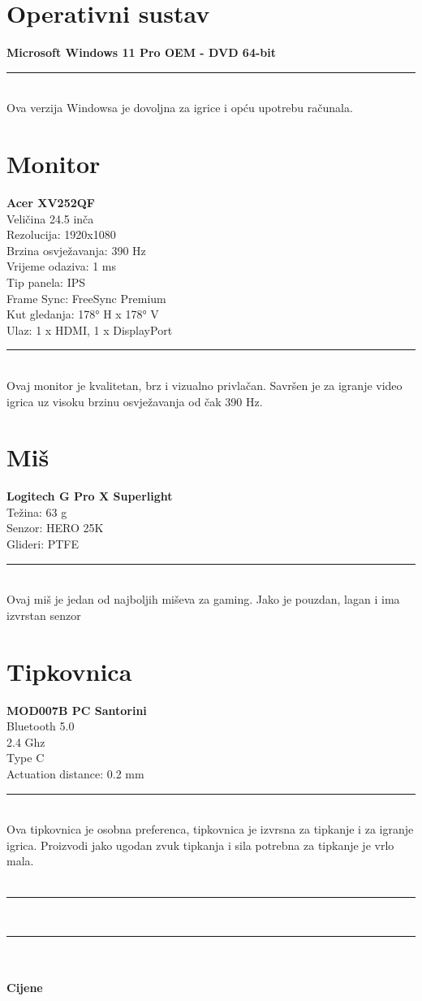 \documentclass{article}
\begin{document}
\section{Operativni sustav}
\textbf{Microsoft Windows 11 Pro OEM - DVD 64-bit}
\\ \rule{\textwidth}{0.5pt}
\\ Ova verzija Windowsa je dovoljna za igrice i opću upotrebu računala.

\section{Monitor}
\textbf{Acer XV252QF}
\\ Veličina 24.5 inča
\\ Rezolucija: 1920x1080
\\ Brzina osvježavanja: 390 Hz
\\ Vrijeme odaziva: 1 ms
\\ Tip panela: IPS
\\ Frame Sync: FreeSync Premium
\\ Kut gledanja: 178° H x 178° V
\\ Ulaz: 1 x HDMI, 1 x DisplayPort
\\ \rule{\textwidth}{0.5pt}
\\ Ovaj monitor je kvalitetan, brz i vizualno privlačan. Savršen je za igranje video igrica uz visoku brzinu osvježavanja od čak 390 Hz.

\section{Miš}
\textbf{Logitech G Pro X Superlight}
\\ Težina: 63 g
\\ Senzor: HERO 25K
\\ Glideri: PTFE
\\ \rule{\textwidth}{0.5pt}
\\ Ovaj miš je jedan od najboljih miševa za gaming. Jako je pouzdan, lagan i ima izvrstan senzor

\section{Tipkovnica}
\textbf{MOD007B PC Santorini}
\\ Bluetooth 5.0
\\ 2.4 Ghz
\\ Type C
\\ Actuation distance: 0.2 mm
\\ \rule{\textwidth}{0.5pt}
\\ Ova tipkovnica je osobna preferenca, tipkovnica je izvrsna za tipkanje i za igranje igrica. Proizvodi jako ugodan zvuk tipkanja i sila potrebna za tipkanje je vrlo mala.
\\
\\ \rule{\textwidth}{0.5pt}
\\ \rule{\textwidth}{0.5pt}
\\
\\ \textbf{Cijene}
\\
\end{document}
